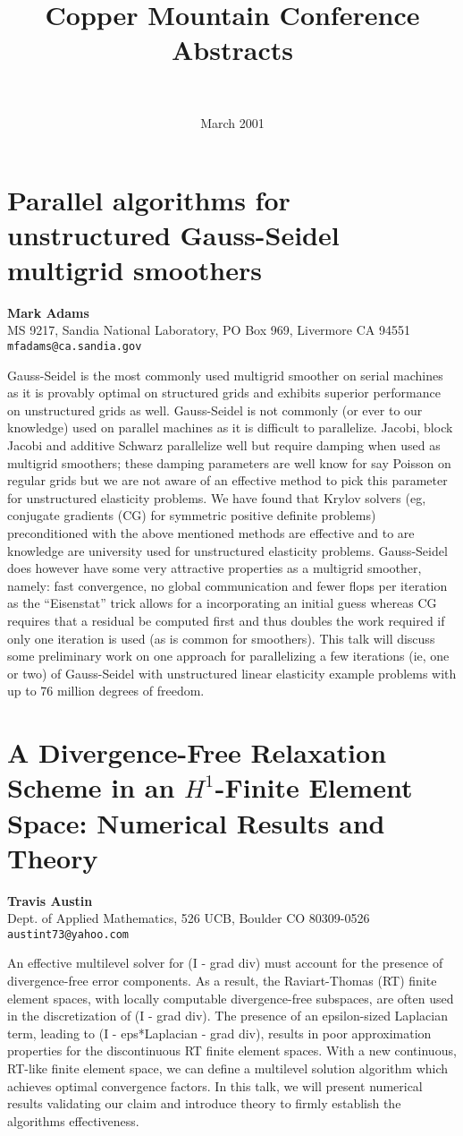 \documentclass[11pt]{article}
\title{Copper Mountain Conference Abstracts}
\author{~ }
\date{March 2001}
\newcommand{\nextab}[4]{
	\section{#2}
	{\bf #1} \\ \nopagebreak
	{#3} \\ \nopagebreak
	{\tt #4} \nopagebreak
	}
\begin{document}
\maketitle



\nextab
	{Mark Adams}
	{Parallel algorithms for unstructured Gauss-Seidel multigrid smoothers}
	{MS 9217, Sandia National Laboratory, PO Box 969, Livermore CA 94551}
	{mfadams@ca.sandia.gov}

Gauss-Seidel is the most commonly used multigrid smoother on
serial machines as it is provably optimal on structured grids
and exhibits superior performance on unstructured grids as
well.  Gauss-Seidel is not commonly (or ever to our knowledge)
used on parallel machines as it is difficult to parallelize.
Jacobi, block Jacobi and additive Schwarz parallelize well but
require damping when used as multigrid smoothers; these damping
parameters are well know for say Poisson on regular grids but we
are not aware of an effective method to pick this parameter for
unstructured elasticity problems.  We have found that Krylov
solvers (eg, conjugate gradients (CG) for symmetric positive
definite problems) preconditioned with the above mentioned
methods are effective and to are knowledge are university used
for unstructured elasticity problems.  Gauss-Seidel does however
have some very attractive properties as a multigrid smoother,
namely: fast convergence, no global communication and fewer
flops per iteration as the ``Eisenstat'' trick allows for a
incorporating an initial guess whereas CG requires that a
residual be computed first and thus doubles the work required if
only one iteration is used (as is common for smoothers).  This
talk will discuss some preliminary work on one approach for
parallelizing a few iterations (ie, one or two) of Gauss-Seidel
with unstructured linear elasticity example problems with up to
76 million degrees of freedom.




\nextab
{Travis Austin}
{A Divergence-Free Relaxation Scheme in an
	$H^1$-Finite Element Space: Numerical Results and Theory}
{Dept. of Applied Mathematics, 526 UCB, Boulder CO 80309-0526}
{austint73@yahoo.com}


An effective multilevel solver for (I - grad div) must account for the
presence of divergence-free error components.  As a result, the Raviart-Thomas
(RT) finite element spaces, with locally computable divergence-free
subspaces, are often used in the discretization of (I - grad div).
The presence of an epsilon-sized Laplacian term, leading to
(I - eps*Laplacian - grad div),
results in poor approximation properties for the
discontinuous RT finite element spaces.  With a new continuous, RT-like
finite element space, we can define a multilevel solution algorithm which
achieves optimal convergence factors.  In this talk, we will present numerical
results validating our claim and introduce theory to firmly establish the
algorithms effectiveness.
\end{document}
